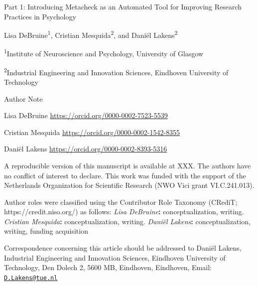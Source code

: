 \documentclass[
  letterpaper,
  12pt]{article}
\author{Lisa DeBruine \and Cristian Mesquida \and Daniël Lakens}
\date{}
\newcommand{\apatitle}[1]{%
  {\centering\bfseries #1\par}}
\newenvironment{apaauthor}
  {\par\centering}
  {\par}
\newcommand{\apatitlepageheading}[1]{%
  {\centering\bfseries #1\par}}
\begin{document}
\hfill\break

\hfill\break

\vspace*{3\baselineskip}

\apatitle{

Part 1: Introducing Metacheck as an Automated Tool for Improving
Research Practices in Psychology

}

\begin{apaauthor}

\hfill\break

Lisa DeBruine\textsuperscript{1}, Cristian Mesquida\textsuperscript{2}, and Daniël Lakens\textsuperscript{2}

\textsuperscript{1}Institute of Neuroscience and Psychology, University
of Glasgow

\textsuperscript{2}Industrial Engineering and Innovation
Sciences, Eindhoven University of Technology

\end{apaauthor}

\hfill\break

\hfill\break

\apatitlepageheading{

Author Note

}

Lisa DeBruine 
\url{https://orcid.org/0000-0002-7523-5539}

Cristian Mesquida 
\url{https://orcid.org/0000-0002-1542-8355}

Daniël Lakens 
\url{https://orcid.org/0000-0002-8393-5316}

A reproducible version of this manuscript is available at XXX. The
authors have no conflict of interest to declare. This work was funded
with the support of the Netherlands Organization for Scientific Research
(NWO Vici grant VI.C.241.013).

Author roles were classified using the Contributor Role Taxonomy
(CRediT; https://credit.niso.org/) as follows: \emph{Lisa
DeBruine}\textbf{: }conceptualization, writing. \emph{Cristian
Mesquida}\textbf{: }conceptualization, writing. \emph{Daniël
Lakens}\textbf{: }conceptualization, writing, funding acquisition

Correspondence concerning this article should be addressed to Daniël
Lakens, Industrial Engineering and Innovation Sciences, Eindhoven
University of Technology, Den Dolech 2, 5600 MB,
Eindhoven, Eindhoven, Email:
\href{mailto:D.Lakens@tue.nl}{\nolinkurl{D.Lakens@tue.nl}}
\end{document}
